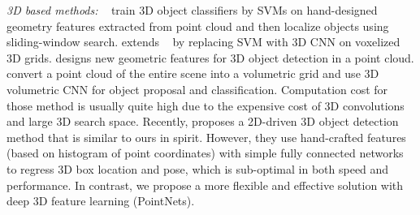 \emph{3D based methods:} ~\cite{wang2015voting, song2014sliding} train 3D object classifiers by SVMs on hand-designed geometry features extracted from point cloud and then localize objects using sliding-window search. \cite{engelcke2017vote3deep} extends ~\cite{wang2015voting} by replacing SVM with 3D CNN on voxelized 3D grids. \cite{ren2016three} designs new geometric features for 3D object detection in a point cloud. \cite{song2016deep, li20163d} convert a point cloud of the entire scene into a volumetric grid and use 3D volumetric CNN for object proposal and classification. Computation cost for those method is usually quite high due to the expensive cost of 3D convolutions and large 3D search space.
Recently, \cite{lahoud20172d} proposes a 2D-driven 3D object detection method that is similar to ours in spirit. However, they use hand-crafted features (based on histogram of point coordinates) with simple fully connected networks to regress 3D box location and pose, which is sub-optimal in both speed and performance. In contrast, we propose a more flexible and effective solution with deep 3D feature learning (PointNets).


